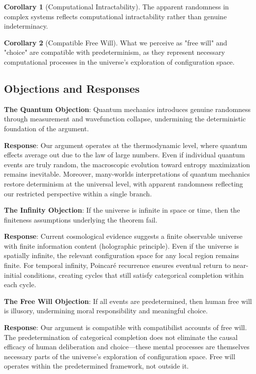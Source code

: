 \documentclass[12pt,a4paper]{article}
\theoremstyle{definition}
\newtheorem{corollary}{Corollary}[section]
\begin{document}
{\begin{corollary}[Computational Intractability]
The apparent randomness in complex systems reflects computational intractability rather than genuine indeterminacy.
\end{corollary}

\begin{corollary}[Compatible Free Will]
What we perceive as "free will" and "choice" are compatible with predeterminism, as they represent necessary computational processes in the universe's exploration of configuration space.
\end{corollary}

\subsection{Objections and Responses}

\textbf{The Quantum Objection}: Quantum mechanics introduces genuine randomness through measurement and wavefunction collapse, undermining the deterministic foundation of the argument.

\textbf{Response}: Our argument operates at the thermodynamic level, where quantum effects average out due to the law of large numbers. Even if individual quantum events are truly random, the macroscopic evolution toward entropy maximization remains inevitable. Moreover, many-worlds interpretations of quantum mechanics restore determinism at the universal level, with apparent randomness reflecting our restricted perspective within a single branch.

\textbf{The Infinity Objection}: If the universe is infinite in space or time, then the finiteness assumptions underlying the theorem fail.

\textbf{Response}: Current cosmological evidence suggests a finite observable universe with finite information content (holographic principle). Even if the universe is spatially infinite, the relevant configuration space for any local region remains finite. For temporal infinity, Poincaré recurrence ensures eventual return to near-initial conditions, creating cycles that still satisfy categorical completion within each cycle.

\textbf{The Free Will Objection}: If all events are predetermined, then human free will is illusory, undermining moral responsibility and meaningful choice.

\textbf{Response}: Our argument is compatible with compatibilist accounts of free will. The predetermination of categorical completion does not eliminate the causal efficacy of human deliberation and choice—these mental processes are themselves necessary parts of the universe's exploration of configuration space. Free will operates within the predetermined framework, not outside it.

}
\end{document}
